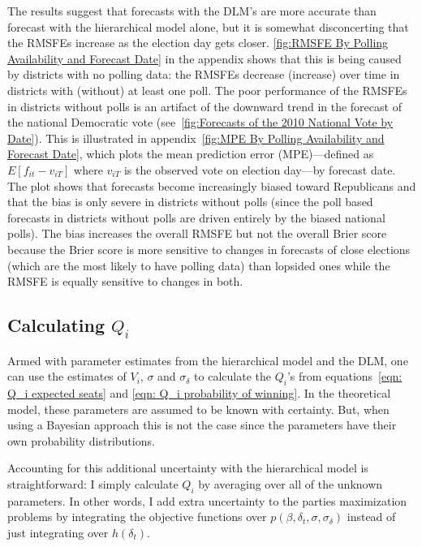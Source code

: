 \documentclass[12pt,final,fleqn]{article}
\theoremstyle{plain}
\begin{document}
The results suggest that forecasts with the DLM's are more accurate than forecast with the hierarchical model alone, but it is somewhat disconcerting that the RMSFEs increase as the election day gets closer. \autoref{fig:RMSFE By Polling Availability and Forecast Date} in the appendix shows that this is being caused by districts with no polling data: the RMSFEs decrease (increase) over time in districts with (without) at least one poll. The poor performance of the RMSFEs in districts without polls is an artifact of the downward trend in the forecast of the national Democratic vote (see~\autoref{fig:Forecasts of the 2010 National Vote by Date}). This is illustrated in appendix~\autoref{fig:MPE By Polling Availability and Forecast Date}, which plots the mean prediction error (MPE)---defined as $E[f_{it}-v_{iT}]$ where $v_{iT}$ is the observed vote on election day---by forecast date. The plot shows that forecasts become increasingly biased toward Republicans and that the bias is only severe in districts without polls (since the poll based forecasts in districts without polls are driven entirely by the biased national polls). The bias increases the overall RMSFE but not the overall Brier score because the Brier score is more sensitive to changes in forecasts of close elections (which are the most likely to have polling data) than lopsided ones while the RMSFE is equally sensitive to changes in both.


\subsection{Calculating $Q_i$} \label{sec: calculating Q}
Armed with parameter estimates from the hierarchical model and the DLM, one can use the estimates of $V_{i}$, $\sigma$ and $\sigma_\delta$ to calculate the $Q_i$'s from equations~\ref{eqn: Q_i expected seats} and \ref{eqn: Q_i probability of winning}. In the theoretical model, these parameters are assumed to be known with certainty. But, when using a Bayesian approach this is not the case since the parameters have their own probability distributions. 

Accounting for this additional uncertainty with the hierarchical model is straightforward: I simply calculate $Q_i$ by averaging over all of the unknown parameters. In other words, I add extra uncertainty to the parties maximization problems by integrating the objective functions over $p(\beta, \delta_t, \sigma, \sigma_\delta)$ instead of just integrating over $h(\delta_t)$.
\end{document}
